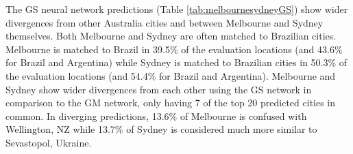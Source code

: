 \documentclass[10pt,letterpaper]{article}
\begin{document}
The GS neural network predictions (Table \ref{tab:melbournesydneyGS}) show wider divergences from other Australia cities and between Melbourne and Sydney themselves. Both Melbourne and Sydney are often matched to Brazilian cities. Melbourne is matched to Brazil in 39.5\% of the evaluation locations (and 43.6\% for Brazil and Argentina) while Sydney is matched to Brazilian cities in 50.3\% of the evaluation locations (and 54.4\% for Brazil and Argentina). Melbourne and Sydney show wider divergences from each other using the GS network in comparison to the GM network, only having 7 of the top 20 predicted cities in common. In diverging predictions, 13.6\% of Melbourne is confused with Wellington, NZ while 13.7\% of Sydney is considered much more similar to Sevastopol, Ukraine. 
\end{document}

